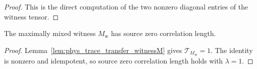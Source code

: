 \begin{proof}
    \leanok
    This is the direct computation of the two nonzero diagonal entries of the
    witness tensor.
\end{proof}

\begin{theorem}
    \label{thm:witness_source_zcl}
    \leanok
    The maximally mixed witness $M_{\mathrm w}$ has source zero correlation
    length.
\end{theorem}
\begin{proof}\leanok
    Lemma~\ref{lem:phys_trace_transfer_witnessM} gives
    $\mathcal T_{M_{\mathrm w}}=1$. The identity is nonzero and idempotent, so
    source zero correlation length holds with $\lambda = 1$.
\end{proof}
